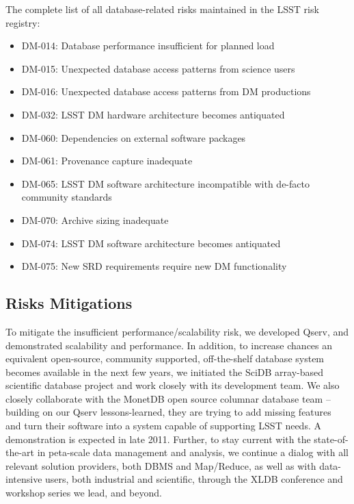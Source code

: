 \documentclass[DM,lsstdraft,toc]{lsstdoc}
\begin{document}
The complete list of all database-related risks maintained in the LSST
risk registry:

\begin{itemize}
\item
  DM-014: Database performance insufficient for planned load
\item
  DM-015: Unexpected database access patterns from science users
\item
  DM-016: Unexpected database access patterns from DM productions
\item
  DM-032: LSST DM hardware architecture becomes antiquated
\item
  DM-060: Dependencies on external software packages
\item
  DM-061: Provenance capture inadequate
\item
  DM-065: LSST DM software architecture incompatible with de-facto
  community standards
\item
  DM-070: Archive sizing inadequate
\item
  DM-074: LSST DM software architecture becomes antiquated
\item
  DM-075: New SRD requirements require new DM functionality
\end{itemize}

\subsection{Risks Mitigations}\label{risks-mitigations}

To mitigate the insufficient performance/scalability risk, we developed
Qserv, and demonstrated scalability and performance. In addition, to
increase chances an equivalent open-source, community supported,
off-the-shelf database system becomes available in the next few years,
we initiated the SciDB array-based scientific database project and work
closely with its development team. We also closely collaborate with the
MonetDB open source columnar database team -- building on our Qserv
lessons-learned, they are trying to add missing features and turn their
software into a system capable of supporting LSST needs. A demonstration
is expected in late 2011. Further, to stay current with the
state-of-the-art in peta-scale data management and analysis, we continue
a dialog with all relevant solution providers, both DBMS and Map/Reduce,
as well as with data-intensive users, both industrial and scientific,
through the XLDB conference and workshop series
we lead, and beyond.
\end{document}
